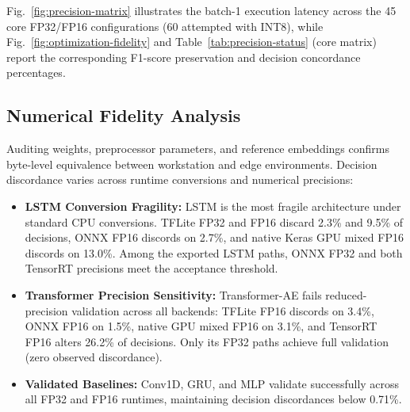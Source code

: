 \documentclass[11pt,a4paper]{article}
\begin{document}
Fig.~\ref{fig:precision-matrix} illustrates the batch-1 execution latency across the 45 core FP32/FP16 configurations (60 attempted with INT8), while Fig.~\ref{fig:optimization-fidelity} and Table~\ref{tab:precision-status} (core matrix) report the corresponding F1-score preservation and decision concordance percentages.

\subsection{Numerical Fidelity Analysis}
Auditing weights, preprocessor parameters, and reference embeddings confirms byte-level equivalence between workstation and edge environments. Decision discordance varies across runtime conversions and numerical precisions:
\begin{itemize}
    \item \textbf{LSTM Conversion Fragility:} LSTM is the most fragile architecture under standard CPU conversions. TFLite FP32 and FP16 discard 2.3\% and 9.5\% of decisions, ONNX FP16 discords on 2.7\%, and native Keras GPU mixed FP16 discords on 13.0\%. Among the exported LSTM paths, ONNX FP32 and both TensorRT precisions meet the acceptance threshold.
    \item \textbf{Transformer Precision Sensitivity:} Transformer-AE fails reduced-precision validation across all backends: TFLite FP16 discords on 3.4\%, ONNX FP16 on 1.5\%, native GPU mixed FP16 on 3.1\%, and TensorRT FP16 alters 26.2\% of decisions. Only its FP32 paths achieve full validation (zero observed discordance).
    \item \textbf{Validated Baselines:} Conv1D, GRU, and MLP validate successfully across all FP32 and FP16 runtimes, maintaining decision discordances below 0.71\%.
\end{itemize}
\end{document}
